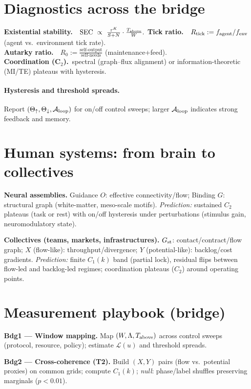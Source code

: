\documentclass[12pt,a4paper,oneside]{scrreprt}
\begin{document}
\section{Diagnostics across the bridge}\label{sec:bridge-diagnostics}
\textbf{Existential stability.}\ \ 
\(
\mathrm{SEC}\ \propto\ \frac{\tau^K}{S+N}\cdot\frac{T_{\rm above}}{W}.
\)
\textbf{Tick ratio.}\ \
\(R_{\rm tick}:=f_{\rm agent}/f_{\rm env}\) (agent vs.\ environment tick rate).\\
\textbf{Autarky ratio.}\ \
\(R_0:=\frac{\text{self-output}}{\text{self-needs}}\) (maintenance+feed).\\
\textbf{Coordination (C$_2$).}\ spectral (graph–flux alignment) or information-theoretic (MI/TE) plateaus with hysteresis.

\paragraph{Hysteresis and threshold spreads.}
Report $(\Theta_\uparrow,\Theta_\downarrow,\mathcal A_{\rm loop})$ for on/off control sweeps; larger $\mathcal A_{\rm loop}$ indicates strong feedback and memory.

\section{Human systems: from brain to collectives}\label{sec:human-systems}
\textbf{Neural assemblies.} 
Guidance $O$: effective connectivity/flow; 
Binding $G$: structural graph (white-matter, meso-scale motifs). 
\emph{Prediction:} sustained $C_2$ plateaus (task or rest) with on/off hysteresis under perturbations (stimulus gain, neuromodulatory state).

\textbf{Collectives (teams, markets, infrastructures).}
$G_{\rm st}$: contact/contract/flow graph; 
$X$ (flow-like): throughput/divergence; $Y$ (potential-like): backlog/cost gradients. 
\emph{Prediction:} finite $C_1(k)$ band (partial lock), residual flips between flow-led and backlog-led regimes; coordination plateaus ($C_2$) around operating points.

\section{Measurement playbook (bridge)}\label{sec:bridge-playbook}
\textbf{Bdg1 — Window mapping.}
Map $(W,\Lambda,T_{\rm above})$ across control sweeps (protocol, resource, policy); estimate $\mathcal L(u)$ and threshold spreads.

\textbf{Bdg2 — Cross-coherence (T2).}
Build $(X,Y)$ pairs (flow vs.\ potential proxies) on common grids; compute $C_1(k)$; \emph{null}: phase/label shuffles preserving marginals ($p<0.01$).
\end{document}
